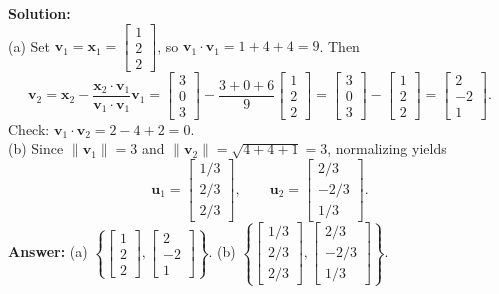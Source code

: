 \documentclass[11pt, letterpaper]{article}
\theoremstyle{definition}
\theoremstyle{remark}
\begin{document}
\textbf{Solution:} \\
(a) Set $\mathbf{v}_1 = \mathbf{x}_1 = \begin{bmatrix} 1 \\ 2 \\ 2 \end{bmatrix}$, so $\mathbf{v}_1 \cdot \mathbf{v}_1 = 1 + 4 + 4 = 9$. Then
\[
\mathbf{v}_2 = \mathbf{x}_2 - \frac{\mathbf{x}_2 \cdot \mathbf{v}_1}{\mathbf{v}_1 \cdot \mathbf{v}_1}\mathbf{v}_1 = \begin{bmatrix} 3 \\ 0 \\ 3 \end{bmatrix} - \frac{3 + 0 + 6}{9}\begin{bmatrix} 1 \\ 2 \\ 2 \end{bmatrix} = \begin{bmatrix} 3 \\ 0 \\ 3 \end{bmatrix} - \begin{bmatrix} 1 \\ 2 \\ 2 \end{bmatrix} = \begin{bmatrix} 2 \\ -2 \\ 1 \end{bmatrix}.
\]
Check: $\mathbf{v}_1 \cdot \mathbf{v}_2 = 2 - 4 + 2 = 0$. \\
(b) Since $\|\mathbf{v}_1\| = 3$ and $\|\mathbf{v}_2\| = \sqrt{4 + 4 + 1} = 3$, normalizing yields
\[
\mathbf{u}_1 = \begin{bmatrix} 1/3 \\ 2/3 \\ 2/3 \end{bmatrix}, \qquad
\mathbf{u}_2 = \begin{bmatrix} 2/3 \\ -2/3 \\ 1/3 \end{bmatrix}.
\]
\textbf{Answer:} (a) $\left\{\begin{bmatrix} 1 \\ 2 \\ 2 \end{bmatrix}, \begin{bmatrix} 2 \\ -2 \\ 1 \end{bmatrix}\right\}$. (b) $\left\{\begin{bmatrix} 1/3 \\ 2/3 \\ 2/3 \end{bmatrix}, \begin{bmatrix} 2/3 \\ -2/3 \\ 1/3 \end{bmatrix}\right\}$.
\end{document}
